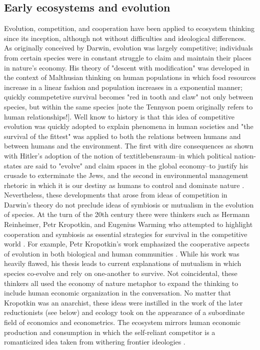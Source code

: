 \subsection{Early ecosystems and evolution}
Evolution, competition, and cooperation have been applied to ecosystem thinking since its inception, although not without difficulties and ideological differences. As originally conceived by Darwin, evolution was largely competitive; individuals from certain species were in constant struggle to claim and maintain their places in nature's economy. His theory of "descent with modification" was developed in the context of Malthusian thinking on human populations in which food resources increase in a linear fashion and population increases in a exponential manner; quickly commpetetive survival becomes "red in tooth and claw" not only between species, but within the same species \cite{stoddart_1966,tennyson_1849} [note the Tennyson poem originally refers to human relationships!]. Well know to history is that this idea of competitive evolution was quickly adopted to explain phenomena in human societies and "the survival of the fittest" was applied to both the relations between humans and between humans and the environment. The first with dire consequences as shown with Hitler's adoption of the notion of textit{lebensraum}--in which political nation-states are said to "evolve" and claim spaces in the global economy--to justify his crusade to exterminate the Jews, and the second in environmental management rhetoric in which it is our destiny as humans to control and dominate nature \cite{stoddart_1966,worster_1977}. Nevertheless, these developments that arose from ideas of competition in Darwin's theory do not preclude ideas of symbiosis or mutualism in the evolution of species. At the turn of the 20th century there were thinkers such as Hermann Reinheimer, Petr Kropotkin, and Eugenius Warming who attempted to highlight cooperation and symbiosis as essential strategies for survival in the competitive world \cite{worster_1977}. For example, Petr Kropotkin's work emphasized the cooperative aspects of evolution in both biological and human communities \cite{kropotkin_1902}. While his work was heavily flawed, his thesis leads to current explanations of mutualism in which species co-evolve and rely on one-another to survive. Not coincidental, these thinkers all used the economy of nature metaphor to expand the thinking to include human economic organization in the conversation. No matter that Kropotkin was an anarchist, these ideas were instilled in the work of the later reductionists (see below) and ecology took on the appearance of a subordinate field of economics and econometrics. The ecosystem mirrors human economic production and consumption in which the self-reliant competitor is a romanticized idea taken from withering frontier ideologies \cite{worster_1977}.


